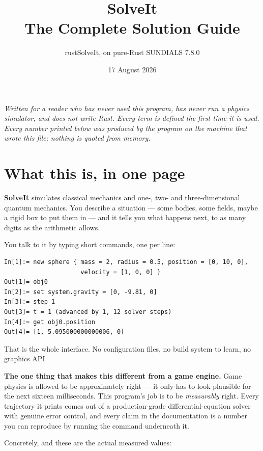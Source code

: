\documentclass[11pt]{article}
\title{SolveIt\\[2pt]\large The Complete Solution Guide}
\author{rustSolveIt, on pure-Rust SUNDIALS 7.8.0}
\date{17 August 2026}
\begin{document}
\maketitle

\begin{center}
\emph{Written for a reader who has never used this program, has never run
a physics simulator, and does not write Rust. Every term is defined the
first time it is used. Every number printed below was produced by the
program on the machine that wrote this file; nothing is quoted from
memory.}
\end{center}

\tableofcontents
\newpage

\section{What this is, in one page}

\textbf{SolveIt} simulates classical mechanics and one-, two- and
three-dimensional quantum mechanics. You describe a situation --- some
bodies, some fields, maybe a rigid box to put them in --- and it tells
you what happens next, to as many digits as the arithmetic allows.

You talk to it by typing short commands, one per line:

\begin{lstlisting}
In[1]:= new sphere { mass = 2, radius = 0.5, position = [0, 10, 0],
                     velocity = [1, 0, 0] }
Out[1]= obj0
In[2]:= set system.gravity = [0, -9.81, 0]
In[3]:= step 1
Out[3]= t = 1 (advanced by 1, 12 solver steps)
In[4]:= get obj0.position
Out[4]= [1, 5.095000000000006, 0]
\end{lstlisting}

That is the whole interface. No configuration files, no build system to
learn, no graphics API.

\textbf{The one thing that makes this different from a game engine.}
Game physics is allowed to be approximately right --- it only has to
look plausible for the next sixteen milliseconds. This program's job is
to be \emph{measurably} right. Every trajectory it prints comes out of a
production-grade differential-equation solver with genuine error
control, and every claim in the documentation is a number you can
reproduce by running the command underneath it.

Concretely, and these are the actual measured values:
\end{document}
